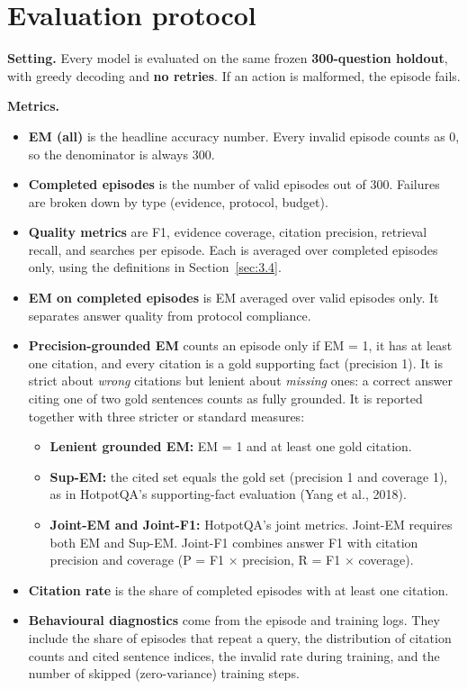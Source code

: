 \section{Evaluation protocol}\label{sec:3.7}

\textbf{Setting.} Every model is evaluated on the same frozen
\textbf{300-question holdout}, with greedy decoding and \textbf{no
retries}. If an action is malformed, the episode fails.

\textbf{Metrics.}

\begin{itemize}
\tightlist
\item
  \textbf{EM (all)} is the headline accuracy number. Every invalid
  episode counts as 0, so the denominator is always 300.
\item
  \textbf{Completed episodes} is the number of valid episodes out of
  300. Failures are broken down by type (evidence, protocol, budget).
\item
  \textbf{Quality metrics} are F1, evidence coverage, citation
  precision, retrieval recall, and searches per episode. Each is
  averaged over completed episodes only, using the definitions in
  Section~\ref{sec:3.4}.
\item
  \textbf{EM on completed episodes} is EM averaged over valid episodes
  only. It separates answer quality from protocol compliance.
\item
  \textbf{Precision-grounded EM} counts an episode only if EM = 1, it
  has at least one citation, and every citation is a gold supporting
  fact (precision 1). It is strict about \emph{wrong} citations but
  lenient about \emph{missing} ones: a correct answer citing one of two
  gold sentences counts as fully grounded. It is reported together with
  three stricter or standard measures:

  \begin{itemize}
  \tightlist
  \item
    \textbf{Lenient grounded EM:} EM = 1 and at least one gold citation.
  \item
    \textbf{Sup-EM:} the cited set equals the gold set (precision 1 and
    coverage 1), as in HotpotQA's supporting-fact evaluation (Yang et
    al., 2018).
  \item
    \textbf{Joint-EM and Joint-F1:} HotpotQA's joint metrics. Joint-EM
    requires both EM and Sup-EM. Joint-F1 combines answer F1 with
    citation precision and coverage (P = F1 × precision, R = F1 ×
    coverage).
  \end{itemize}
\item
  \textbf{Citation rate} is the share of completed episodes with at
  least one citation.
\item
  \textbf{Behavioural diagnostics} come from the episode and training
  logs. They include the share of episodes that repeat a query, the
  distribution of citation counts and cited sentence indices, the
  invalid rate during training, and the number of skipped
  (zero-variance) training steps.
\end{itemize}


